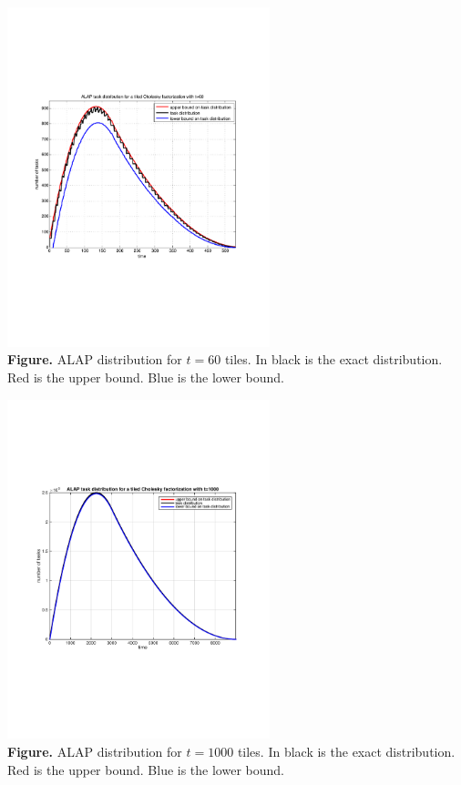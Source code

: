 \begin{frame}





\includegraphics[width=3in]{matlab_files/bornesV2_60.pdf}\\
{\bf Figure.} ALAP distribution for $t=60$ tiles. In black is the exact distribution. Red is the upper bound. Blue is the lower bound.




\end{frame}



\begin{frame}





\includegraphics[width=3in]{matlab_files/bornesV2_1000.pdf}\\
{\bf Figure.} ALAP distribution for $t=1000$ tiles. In black is the exact distribution. Red is the upper bound. Blue is the lower bound.




\end{frame}











